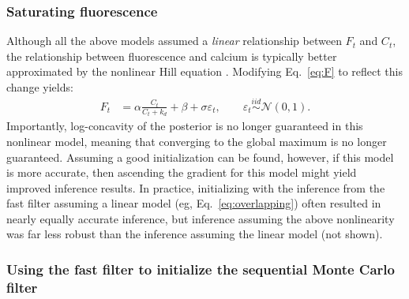 \documentclass{article}
\newcommand{\mN}{\mathcal{N}}
\newcommand{\sig}{\sigma}
\newcommand{\foopsi}{fast }
\begin{document}
\subsubsection{Saturating fluorescence}

Although all the above models assumed a \emph{linear} relationship between $F_t$ and $C_t$, the relationship between fluorescence and calcium is typically better approximated by the nonlinear Hill equation \cite{PologrutoSvoboda04}. Modifying Eq.~\eqref{eq:F} to reflect this change yields: 
\begin{align}
	F_t &= \alpha \frac{C_t}{C_t+k_d} + \beta +  \sig \varepsilon_t, \qquad \varepsilon_t \overset{iid}{\sim} \mN(0,1).
\end{align}
Importantly, log-concavity of the posterior is no longer guaranteed in this nonlinear model, meaning that converging to the global maximum is no longer guaranteed.  Assuming a good initialization can be found, however, if this model is more accurate, then ascending the gradient for this model might yield improved inference results.  In practice, initializing with the  inference from the \foopsi filter assuming a linear model (eg, Eq.~\eqref{eq:overlapping}) often resulted in nearly equally accurate inference, but inference assuming the above nonlinearity was far less robust than the inference assuming the linear model (not shown).  

\subsubsection{Using the \foopsi filter to initialize the sequential Monte Carlo filter}
\end{document}
